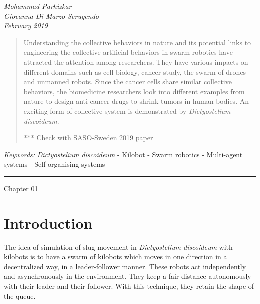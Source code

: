\documentclass[11pt,a4paper]{article}
\begin{document}
\begin{center}
{ }
\vspace{2mm}

{\selectfont\textit{Mohammad Parhizkar \\ Giovanna Di Marzo Serugendo \\ \tiny{February 2019} }}


\end{center}
\begin{abstract}
Understanding the collective behaviors in nature and its potential links to engineering the collective artificial behaviors in swarm robotics have attracted the attention among researchers. They have various impacts on different domains such as cell-biology, cancer study, the swarm of drones and unmanned robots. Since the cancer cells share similar collective behaviors, the biomedicine researchers look into different examples from nature to design anti-cancer drugs to shrink tumors in human bodies. An exciting form of collective system is demonstrated by {\textit{Dictyostelium discoideum}}. 

*** Check with SASO-Sweden 2019 paper

   \end{abstract}

{\footnotesize\textit{Keywords:} {\textit{Dictyostelium discoideum}} - Kilobot - Swarm robotics - Multi-agent systems - Self-organising systems}

{\begin{center}\noindent\rule{14cm}{0.4pt}\end{center}}
 Chapter 01
\section{Introduction}
The idea of simulation of slug movement in \textit{Dictyostelium discoideum} with kilobots is to have a swarm of kilobots which moves in one direction in a decentralized way, in a leader-follower manner. These robots act independently and asynchronously in the environment. They keep a fair distance autonomously with their leader and their follower. With this technique, they retain the shape of the queue.  
\end{document}
